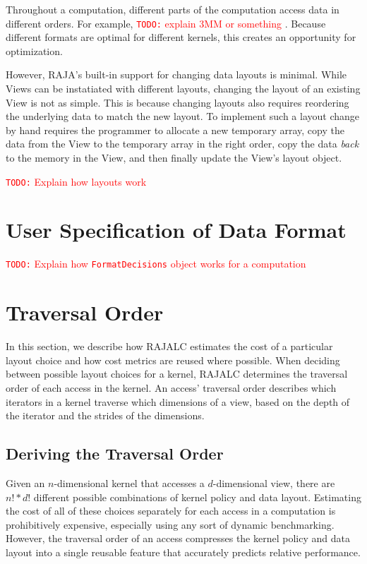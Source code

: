 \documentclass[sigconf, table]{acmart}
\newcommand{\todo}[1]{{\textcolor{red}{{\tt{TODO:}}\,\,#1 }}}
\begin{document}
Throughout a computation, different parts of the computation access data in different orders.
For example, \todo{explain 3MM or something}.
Because different formats are optimal for different kernels, this creates an opportunity for optimization. 

However, RAJA's built-in support for changing data layouts is minimal. 
While Views can be instatiated with different layouts, changing the layout of an existing View is not as simple.
This is because changing layouts also requires reordering the underlying data to match the new layout. 
To implement such a layout change by hand requires the programmer to allocate a new temporary array, copy the data from the View to the temporary array in the right order, copy the data \textit{back} to the memory in the View, and then finally update the View's layout object.

\todo{Explain how layouts work}

\section{User Specification of Data Format}

\todo{Explain how \texttt{FormatDecisions} object works for a computation}

\section{Traversal Order}

In this section, we describe how RAJALC estimates the cost of a particular layout choice and how cost metrics are reused where possible.
When deciding between possible layout choices for a kernel, RAJALC determines the traversal order of each access in the kernel.
An access' traversal order describes which iterators in a kernel traverse which dimensions of a view, based on the depth of the iterator and the strides of the dimensions.

\subsection{Deriving the Traversal Order}

Given an $n$-dimensional kernel that accesses a $d$-dimensional view, there are $n! * d!$ different possible combinations of kernel policy and data layout. 
Estimating the cost of all of these choices separately for each access in a computation is prohibitively expensive, especially using any sort of dynamic benchmarking. 
However, the traversal order of an access compresses the kernel policy and data layout into a single reusable feature that accurately predicts relative performance.
\end{document}
